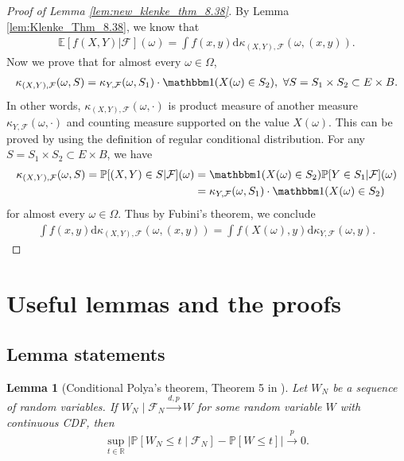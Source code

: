 \documentclass[12pt]{article}
\newtheorem{lemma}{Lemma}
\def\P{\mathbb{P}}
\def\P{\mathbb{P}}
\newcommand{\E}{\mathbb E}								%
\renewcommand{\P}{\mathbb{P}}							%
\newcommand{\R}{\mathbb{R}}								%
\newcommand{\indicator}{\mathbbm 1}						%
\newcommand{\convp}{\overset p \rightarrow}             %
\newcommand{\convdp}{\overset {d,p} \longrightarrow}    %
\begin{document}
\begin{proof}[Proof of Lemma \ref{lem:new_klenke_thm_8.38}]
	By Lemma \ref{lem:Klenke_Thm_8.38}, we know that 
	\begin{align*}
		\E[f(X,Y)|\mathcal{F}](\omega)=\int f(x,y)\mathrm{d}\kappa_{(X,Y),\mathcal{F}}(\omega,(x,y)).
	\end{align*}
	Now we prove that for almost every $\omega\in\Omega$,
	\begin{align*}
		\kappa_{(X,Y),\mathcal{F}}(\omega,S)=\kappa_{Y,\mathcal{F}}(\omega,S_1)\cdot \indicator(X(\omega)\in S_2),\ \forall S=S_1\times S_2\subset E\times B.
	\end{align*}
	In other words, $\kappa_{(X,Y),\mathcal{F}}(\omega,\cdot)$ is product measure of another measure $\kappa_{Y,\mathcal{F}}(\omega,\cdot)$ and counting measure supported on the value $X(\omega)$. This can be proved by using the definition of regular conditional distribution. For any $S=S_1\times S_2\subset E\times B$, we have
	\begin{align*}
		\kappa_{(X,Y),\mathcal{F}}(\omega,S)=\P[(X,Y)\in S|\mathcal{F}](\omega)
		&
		=\indicator(X(\omega)\in S_2)\P[Y\in S_1|\mathcal{F}](\omega)\\
		&
		=\kappa_{Y,\mathcal{F}}(\omega,S_1)\cdot \indicator(X(\omega)\in S_2)
	\end{align*}
	for almost every $\omega\in\Omega$. Thus by Fubini's theorem, we conclude
	\begin{align*}
		\int f(x,y)\mathrm{d}\kappa_{(X,Y),\mathcal{F}}(\omega,(x,y))=\int f(X(\omega),y)\mathrm{d}\kappa_{Y,\mathcal{F}}(\omega,y).
	\end{align*}
\end{proof}


\section{Useful lemmas and the proofs}\label{sec:aux_lemma}


\subsection{Lemma statements}

\begin{lemma}[Conditional Polya's theorem, Theorem 5 in \citet{niu2024reconciling}]\label{lem:cond_polya} 
	Let $W_N$ be a sequence of random variables. If $W_N \mid \mathcal F_N \convdp W$ for some random variable $W$ with continuous CDF, then
	\begin{equation}
		\sup_{t \in \R}|\P[W_N \leq t \mid \mathcal F_N] - \P[W \leq t]| \convp 0.
	\end{equation}
\end{lemma}
\end{document}
